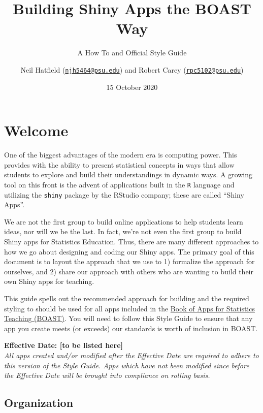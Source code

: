 \documentclass[
]{book}
\title{Building Shiny Apps the BOAST Way}
\subtitle{A How To and Official Style Guide}
\author{Neil Hatfield (\href{mailto:njh5464@psu.edu}{\nolinkurl{njh5464@psu.edu}}) and Robert Carey (\href{mailto:rpc5102@psu.edu}{\nolinkurl{rpc5102@psu.edu}})}
\date{15 October 2020}
\begin{document}
\maketitle

{
\setcounter{tocdepth}{1}
\tableofcontents
}
\hypertarget{welcome}{%
\chapter*{Welcome}\label{welcome}}

One of the biggest advantages of the modern era is computing power. This provides with the ability to present statistical concepts in ways that allow students to explore and build their understandings in dynamic ways. A growing tool on this front is the advent of applications built in the \texttt{R} language and utilizing the \texttt{shiny} package by the RStudio company; these are called ``Shiny Apps''.

We are not the first group to build online applications to help students learn ideas, nor will we be the last. In fact, we're not even the first group to build Shiny apps for Statistics Education. Thus, there are many different approaches to how we go about designing and coding our Shiny apps. The primary goal of this document is to layout the approach that we use to 1) formalize the approach for ourselves, and 2) share our approach with others who are wanting to build their own Shiny apps for teaching.

This guide spells out the recommended approach for building and the required styling to should be used for all apps included in the \href{https://github.com/EducationShinyAppTeam/BOAST}{Book of Apps for Statistics Teaching (BOAST)}. You will need to follow this Style Guide to ensure that any app you create meets (or exceeds) our standards is worth of inclusion in BOAST.

\textbf{Effective Date: {[}to be listed here{]}}\\
\emph{All apps created and/or modified after the Effective Date are required to adhere to this version of the Style Guide. Apps which have not been modified since before the Effective Date will be brought into compliance on rolling basis.}

\hypertarget{organization}{%
\section{Organization}\label{organization}}
\end{document}
